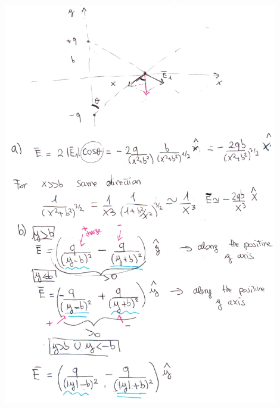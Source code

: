 \documentclass{esg8022pset}
\begin{document}
\begin{solution}
  \begin{center}\includegraphics[width=0.9\textwidth]{ps01_sol_07_1_hand}\end{center}

\end{solution}
\end{document}
